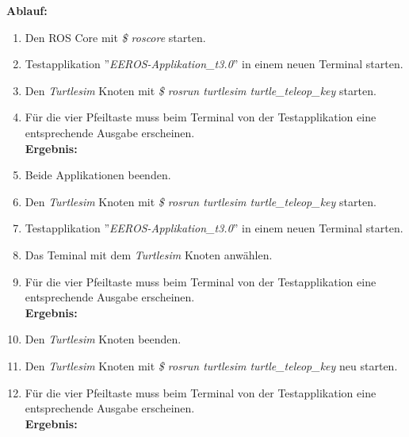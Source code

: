 \textbf{Ablauf: } 
\begin{enumerate}
\item Den ROS Core mit \textit{\$ roscore} starten.
\item Testapplikation ''\textit{EEROS-Applikation\_t3.0}'' in einem neuen Terminal starten.
\item Den \textit{Turtlesim} Knoten mit \textit{\$ rosrun turtlesim turtle\_teleop\_key} starten.
\item Für die vier Pfeiltaste muss beim Terminal von der Testapplikation eine entsprechende Ausgabe erscheinen. \\
\textbf{Ergebnis:} \checkmark
\item Beide Applikationen beenden.
\item Den \textit{Turtlesim} Knoten mit \textit{\$ rosrun turtlesim turtle\_teleop\_key} starten.
\item Testapplikation ''\textit{EEROS-Applikation\_t3.0}'' in einem neuen Terminal starten.
\item Das Teminal mit dem \textit{Turtlesim} Knoten anwählen.
\item Für die vier Pfeiltaste muss beim Terminal von der Testapplikation eine entsprechende Ausgabe erscheinen. \\
\textbf{Ergebnis:} \checkmark
\item Den \textit{Turtlesim} Knoten beenden.
\item Den \textit{Turtlesim} Knoten mit \textit{\$ rosrun turtlesim turtle\_teleop\_key} neu starten.
\item Für die vier Pfeiltaste muss beim Terminal von der Testapplikation eine entsprechende Ausgabe erscheinen. \\
\textbf{Ergebnis:} \checkmark
\end{enumerate}




%
%
